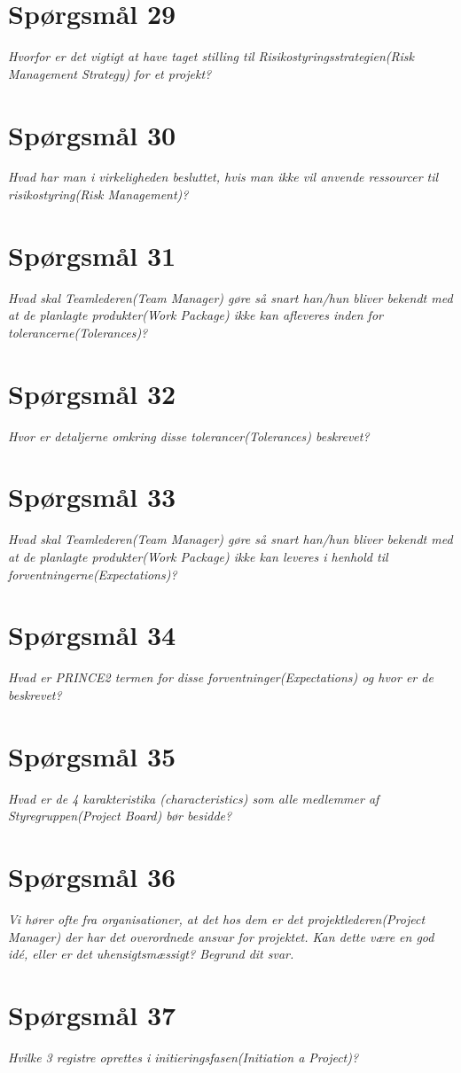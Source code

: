 \section{Spørgsmål 29}
\textit{Hvorfor er det vigtigt at have taget stilling til Risikostyringsstrategien(Risk Management Strategy) for et projekt?}
\section{Spørgsmål 30}
\textit{Hvad har man i virkeligheden besluttet, hvis man ikke vil anvende ressourcer til risikostyring(Risk Management)?}
\section{Spørgsmål 31}
\textit{Hvad skal Teamlederen(Team Manager) gøre så snart han/hun bliver bekendt med at de planlagte produkter(Work Package) ikke kan afleveres inden for tolerancerne(Tolerances)?}
\section{Spørgsmål 32}
\textit{Hvor er detaljerne omkring disse tolerancer(Tolerances) beskrevet?}
\section{Spørgsmål 33}
\textit{Hvad skal Teamlederen(Team Manager) gøre så snart han/hun bliver bekendt med at de planlagte produkter(Work Package) ikke kan leveres i henhold til forventningerne(Expectations)?}
\section{Spørgsmål 34}
\textit{Hvad er PRINCE2 termen for disse forventninger(Expectations) og hvor er de beskrevet?}
\section{Spørgsmål 35}
\textit{Hvad er de 4 karakteristika (characteristics) som alle medlemmer af Styregruppen(Project Board) bør besidde?}
\section{Spørgsmål 36}
\textit{Vi hører ofte fra organisationer, at det hos dem er det projektlederen(Project Manager) der har det overordnede ansvar for projektet. Kan dette være en god idé, eller er det uhensigtsmæssigt? Begrund dit svar.}
\section{Spørgsmål 37}
\textit{Hvilke 3 registre oprettes i initieringsfasen(Initiation a Project)?}
